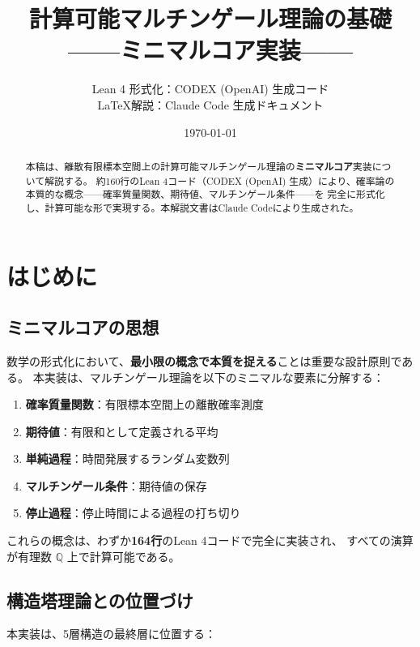 \documentclass[a4paper,12pt]{ltjsarticle}
\title{計算可能マルチンゲール理論の基礎\\——ミニマルコア実装——}
\author{%
  Lean 4 形式化：CODEX (OpenAI) 生成コード\\[0.5em]
  \LaTeX 解説：Claude Code 生成ドキュメント%
}
\date{\today}
\theoremstyle{definition}
\begin{document}
\maketitle

\begin{abstract}
本稿は、離散有限標本空間上の計算可能マルチンゲール理論の\textbf{ミニマルコア}実装について解説する。
約160行のLean 4コード（CODEX (OpenAI) 生成）により、確率論の本質的な概念——確率質量関数、期待値、マルチンゲール条件——を
完全に形式化し、計算可能な形で実現する。本解説文書はClaude Codeにより生成された。
\end{abstract}

\tableofcontents

\section{はじめに}

\subsection{ミニマルコアの思想}

数学の形式化において、\textbf{最小限の概念で本質を捉える}ことは重要な設計原則である。
本実装は、マルチンゲール理論を以下のミニマルな要素に分解する：

\begin{enumerate}
\item \textbf{確率質量関数}：有限標本空間上の離散確率測度
\item \textbf{期待値}：有限和として定義される平均
\item \textbf{単純過程}：時間発展するランダム変数列
\item \textbf{マルチンゲール条件}：期待値の保存
\item \textbf{停止過程}：停止時間による過程の打ち切り
\end{enumerate}

これらの概念は、わずか\textbf{164行}のLean 4コードで完全に実装され、
すべての演算が有理数 $\mathbb{Q}$ 上で計算可能である。

\subsection{構造塔理論との位置づけ}

本実装は、5層構造の最終層に位置する：
\end{document}

